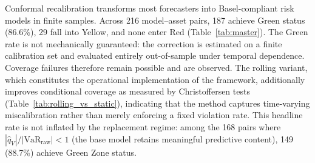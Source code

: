 \documentclass[preprint,11pt,authoryear]{elsarticle}
\newcommand{\1}{\boldsymbol{1}}
\begin{document}
	Conformal recalibration transforms most forecasters into
	Basel-compliant risk models in finite samples. Across 216 model--asset
	pairs, 187 achieve Green status (86.6\%), 29 fall into Yellow,
	and none enter Red (Table~\ref{tab:master}).
	The Green rate is not mechanically guaranteed: the correction is estimated on a finite calibration set and evaluated entirely out-of-sample under temporal dependence. Coverage failures therefore remain possible and are observed. The rolling variant, which constitutes the operational implementation of the framework, additionally improves conditional coverage as measured by Christoffersen tests (Table~\ref{tab:rolling_vs_static}), indicating that the method captures time-varying miscalibration rather than merely enforcing a fixed violation rate.
	This headline rate
	is not inflated by the replacement regime: among the 168 pairs
	where $|\hat{q}_V|/|\mathrm{VaR}_{\mathrm{raw}}| < 1$ (the
	base model retains meaningful predictive content), 149 (88.7\%)
	achieve Green Zone status.
\end{document}
